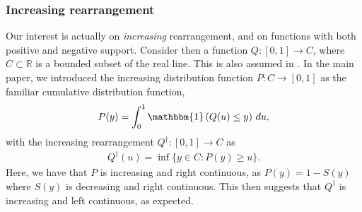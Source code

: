 \documentclass[11pt,a4paper]{article}
\newcommand{\R}{\mathbb{R}}
\begin{document}
\begin{appendices}
\subsubsection{Increasing rearrangement}
Our interest is actually on \textit{increasing} rearrangement, and on functions with both positive and negative support. Consider then a function $Q:[0,1] \to C$, where $C \subset \R$ is a bounded subset of the real line. This is also assumed in \cite{Chernozhukov2009,Chernozhukov2010}.  In the main paper, we introduced the increasing distribution function $P: C \to [0,1]$ as the familiar cumulative distribution function, 
\begin{align*}
    P(y) = \int_0^1 \mathbbm{1}\left(Q(u) \leq y\right)\,du,
\end{align*}
with the increasing rearrangement $Q^{\dagger}: [0,1] \to C$ as 
\begin{align*}
    Q^{\dagger}(u) = \inf\{y \in C: P(y)\geq u\}.
\end{align*}
Here, we have that $P$ is increasing and right continuous, as $P(y) = 1 - S(y)$ where $S(y)$ is decreasing and right continuous. This then suggests that $Q^{\dagger}$ is increasing and left continuous, as expected.


\end{appendices}
\end{document}

